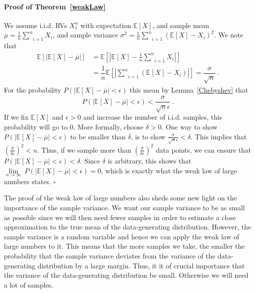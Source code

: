 \paragraph{Proof of Theorem~\ref{weakLaw}} We assume i.i.d. RVs $ X_{1}^{n} $ with expectation $ \mathbb{E}[X] $, and sample mean 
$ \overline{\mu} = \frac{1}{n} \underset{i=1}{\overset{n}{\sum}} X_{i} $, and sample variance 
$ \overline{\sigma}^{2} = \frac{1}{n} \underset{i=1}{\overset{n}{\sum}} \left(\mathbb{E}[X] - X_{i}\right)^{2} $. We note that 
\begin{align}
\mathbb{E}\left[|\mathbb{E}[X] - \overline{\mu}|\right] 
&= \mathbb{E} \left[|\mathbb{E}[X] - \frac{1}{n} \underset{i=1}{\overset{n}{\sum}} X_{i}|\right] \\
&= \dfrac{1}{n} \mathbb{E} \left[|\underset{i=1}{\overset{n}{\sum}}(\mathbb{E}[X] -  X_{i})| \right]
= \dfrac{\overline{\sigma}}{\sqrt{n}} \ .
\end{align}
For the probability $ P(|\mathbb{E}[X] - \overline{\mu}| < \epsilon) $ this mean by Lemma~\ref{Chebyshev} that
\begin{equation}
P(|\mathbb{E}[X] - \overline{\mu}| < \epsilon) < \dfrac{\overline{\sigma}}{\sqrt{n}\epsilon} \ .
\end{equation}
If we fix $ \mathbb{E}[X] $ and $ \epsilon > 0 $ and increase the number of i.i.d. samples, this probability will go to 0.
More formally, choose $ \delta > 0 $. One way to show $ P(|\mathbb{E}[X] - \overline{\mu}| < \epsilon) $ to be smaller than $ \delta $, is to show 
$ \frac{\overline{\sigma}}{\sqrt{n}\epsilon} < \delta $. This implies that $ \left( \frac{\overline{\sigma}}{\delta\epsilon} \right)^{2} < n $. Thus, if we sample
more than $  \left( \frac{\overline{\sigma}}{\delta\epsilon} \right)^{2} $ data points, we can ensure that $ P(|\mathbb{E}[X] - \overline{\mu}| < \epsilon) < \delta $.
Since $ \delta $ is arbitrary, this shows that $ \underset{n \rightarrow \infty}{\lim}~P(|\mathbb{E}[X] - \overline{\mu}| < \epsilon) = 0 $, 
which is exactly what the weak law of large numbers states. $ \square $ \bigskip

The proof of the weak law of large numbers also sheds some new light on the importance of the sample variance. We want our sample variance to be as small as possible
since we will then need fewer samples in order to estimate a close approximation to the true mean of the data-generating distribution. However, the sample variance
is a random variable and hence we can apply the weak law of large numbers to it. This means that the more samples we take, the smaller the probability that the
sample variance deviates from the variance of the data-generating distribution by a large margin. Thus, it it of crucial importance that the variance of the 
data-generating distribution be small. Otherwise we will need a lot of samples.

